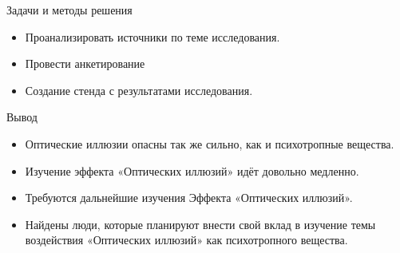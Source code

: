\documentclass[aspectratio=169, 11pt]{beamer}
\institute[\university]{\university \\ \faculty}
\title[\docname]{\docname}
\author[\studentname]{\small Выполнил: студент \group \ \studentname }
\date{2020}
\begin{document}
\begin{frame}
    \titlepage
\end{frame}

\begin{frame}{Задачи и методы решения}
\begin{itemize}
    \item Проанализировать источники по теме исследования.
    \item Провести анкетирование
    \item Создание стенда с результатами исследования.
\end{itemize}
\end{frame}

\begin{frame}{Вывод}
\begin{itemize}
    \item Оптические иллюзии опасны так же сильно, как и психотропные вещества.
    \item Изучение эффекта «Оптических иллюзий» идёт довольно медленно.
    \item Требуются дальнейшие изучения Эффекта «Оптических иллюзий».
    \item Найдены люди, которые планируют внести свой вклад в изучение темы воздействия «Оптических иллюзий» как психотропного вещества.
\end{itemize}
\end{frame}
\end{document}
